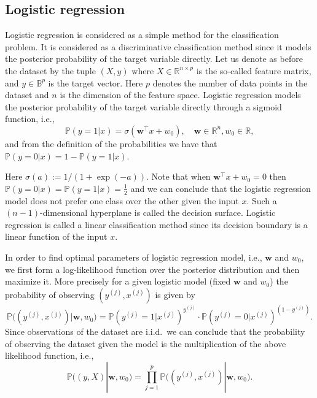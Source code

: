\documentclass[11pt]{article}
\newcommand{\w}{\textbf{w}}
\newcommand{\R}{\mathbb{R}}
\newcommand{\B}{\mathbb{B}}
\newcommand{\Pro}{\mathbb{P}}
\begin{document}
\subsection{Logistic regression}
Logistic regression is considered as a simple method for the
classification problem. It is considered as a discriminative
classification method since it models the posterior probability of the
target variable directly. Let us denote as before the dataset by the
tuple $(X, y)$ where $X \in \R^{n \times p}$ is the so-called feature
matrix, and $y \in \B^{p}$ is the target vector. Here $p$ denotes the
number of data points in the dataset and $n$ is the dimension of the
feature space. Logistic regression models the posterior probability of
the target variable directly through a sigmoid function, i.e.,
\begin{equation}
  \Pro(y=1|x) = \sigma( \w^\top x + w_0), \quad \w \in \R^{n}, w_0 \in \R,
\end{equation}
and from the definition of the probabilities we have that $\Pro(y=0|x) = 1 - \Pro(y=1|x)$.

Here $\sigma(a) := 1/(1+\exp(-a))$. Note that when $\w^\top x + w_0 =
0$ then $\Pro(y=0|x) = \Pro(y=1|x) = \frac12$ and we can conclude that
the logistic regression model does not prefer one class over the other
given the input $x$. Such a $(n-1)$-dimensional hyperplane is called
the decision surface. Logistic regression is called a linear
classification method since its decision boundary is a linear function
of the input $x$.

In order to find optimal parameters of logistic regression model,
i.e., $\w$ and $w_0$, we first form a log-likelihood function over the
posterior distribution and then maximize it. More precisely for a
given logistic model (fixed $\w$ and $w_0$) the probability of
observing $(y^{(j)}, x^{(j)})$ is given by
\begin{equation}
  \Pro\big((y^{(j)}, x^{(j)})| \w, w_0\big) = 
  \Pro(y^{(j)}=1|x^{(j)})^{y^{(j)}} \cdot
  \Pro(y^{(j)}=0|x^{(j)})^{(1-y^{(j)})}.
\end{equation}
Since observations of the dataset are i.i.d.~we can conclude that the
probability of observing the dataset given the model is the
multiplication of the above likelihood function, i.e.,
\begin{equation}
  \Pro\big((y, X)| \w, w_0\big) = \prod_{j=1}^{p} \Pro\big((y^{(j)}, x^{(j)})| \w, w_0\big).
\end{equation}
\end{document}
